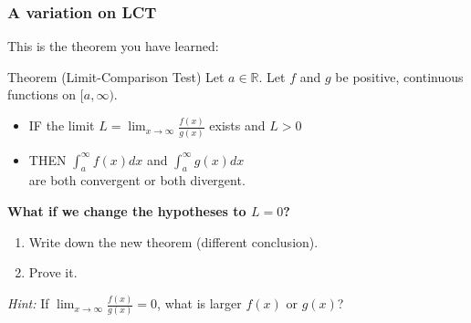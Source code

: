 \begin{frame}[t]
	\fontsize{12}{12}\selectfont
	\frametitle{A variation on LCT}

	This is the theorem you have learned:
	\begin{block}{\fontsize{13}{13}\selectfont Theorem (Limit-Comparison Test)}
		Let $\displaystyle a \in \mathbb{R}$. Let $f$ and $g$ be positive, continuous
		functions on $\displaystyle [a, \infty)$.
		\begin{itemize}
			\item IF the limit \; $\displaystyle L = \lim_{x \to \infty}\frac{f(x)}{g(x)}$
				\; exists and \; $\displaystyle L>0$

			\item THEN $\displaystyle \int_{a}^{\infty}\! \! f(x) dx$ \; and \; $\displaystyle
				\int_{a}^{\infty}\! \! g(x) dx$ \\ are both convergent or both divergent.
		\end{itemize}
	\end{block}

	\vspace{.2cm}
	{\bfseries What if we change the hypotheses to $L=0$?}
	\begin{enumerate}
		\item Write down the new theorem (different conclusion).

		\item Prove it.
	\end{enumerate}

	\vspace{.2cm}
	\emph{Hint:} If $\displaystyle \lim_{x \to \infty}\frac{f(x)}{g(x)}=0$, what
	is larger $f(x)$ or $g(x)$?
\end{frame}

